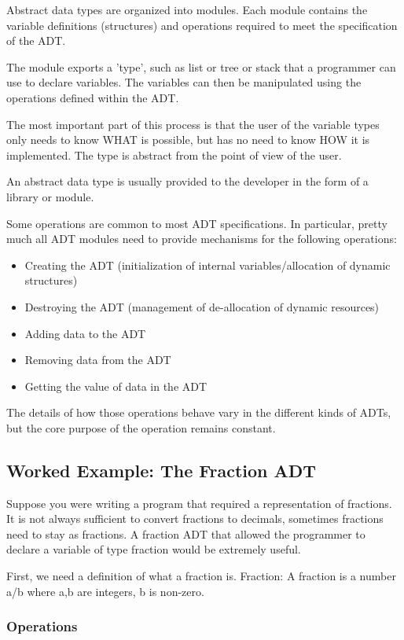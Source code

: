 Abstract data types are organized into modules. Each module contains the variable definitions (structures) and operations required to meet the specification of the ADT.

The module exports a 'type', such as list or tree or stack that a programmer can use to declare variables. The variables can then be manipulated using the operations defined within the ADT.

The most important part of this process is that the user of the variable types only needs to know WHAT is possible, but has no need to know HOW it is implemented. The type is abstract from the point of view of the user.

An abstract data type is usually provided to the developer in the form of a library or module.

Some operations are common to most ADT specifications. In particular, pretty much all ADT modules need to provide mechanisms for the following operations:
\begin{itemize}
\item Creating the ADT (initialization of internal variables/allocation of dynamic structures)
\item Destroying the ADT (management of de-allocation of dynamic resources)
\item Adding data to the ADT
\item Removing data from the ADT
\item Getting the value of data in the ADT
\end{itemize}
The details of how those operations behave vary in the different kinds of ADTs, but the core purpose of the operation remains constant.

\subsection{Worked Example: The Fraction ADT}

Suppose you were writing a program that required a representation of fractions. It is not always sufficient to convert  fractions to decimals, sometimes fractions need to stay as fractions. A fraction ADT that allowed the programmer to declare a variable of type fraction would be extremely useful.

First, we need a definition of what a fraction is. 
Fraction: A fraction is a number a/b where a,b are integers, b is non-zero.

\subsubsection{Operations}


